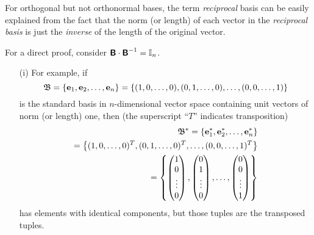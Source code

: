 For orthogonal but not orthonormal bases, the term {\em reciprocal} basis
can be easily explained from the fact that the norm (or length) of each vector in the {\em reciprocal basis}
is just the {\em inverse} of the length of the original vector.

{\color{OliveGreen}
\bproof
For a direct proof, consider $\textsf{\textbf{B}}\cdot \textsf{\textbf{B}}^{-1} ={\Bbb I}_n$.
\eproof
}


{\color{blue}
\bexample
\begin{itemize}
\item[(i)]
For example,
if
$$
{\frak B}=\{{\bf e}_1, {\bf e}_2,\ldots ,{\bf e}_n\}
=
\{
(1,0,\ldots,0),
(0,1,\ldots,0),
\ldots,
(0,0,\ldots,1)
\}
$$
is the standard basis in $n$-dimensional vector space containing unit vectors of norm (or length) one,
then  (the superscript ``$T$'' indicates transposition)
\begin{equation}
\begin{split}
{\frak B}^*
=
\{{\bf e}_1^* ,{\bf e}_2^*, \ldots ,{\bf e}_n^* \}
\\
=
\left\{
(1,0,\ldots,0)^T,
(0,1,\ldots,0)^T,
\ldots,
(0,0,\ldots,1)^T
\right\}
\\
=
\left\{
\begin{pmatrix}
1\\
0\\
\vdots \\
0
\end{pmatrix}
,
\begin{pmatrix}
0\\
1\\
\vdots \\
0
\end{pmatrix}
,
\ldots ,
\begin{pmatrix}
0\\
0\\
\vdots \\
1
\end{pmatrix}
\right
\}
\end{split}
\end{equation}
has elements with identical components,
but those tuples are the transposed tuples.


\end{itemize}}
